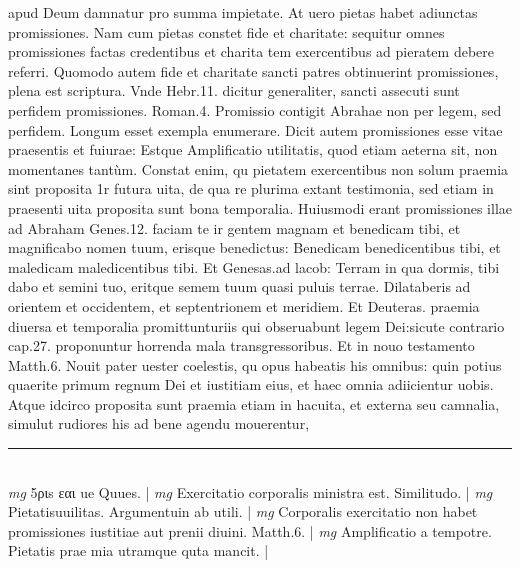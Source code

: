 \documentclass{article}
\begin{document}
\begin{pages}
apud Deum damnatur pro summa impietate. At uero pietas habet adiunctas promissiones. Nam cum pietas constet fide et charitate: sequitur omnes promissiones factas credentibus et charita tem exercentibus ad pieratem debere referri. Quomodo autem fide et charitate sancti patres obtinuerint promissiones, plena est scriptura. Vnde Hebr.11. dicitur generaliter, sancti assecuti sunt perfidem promissiones. Roman.4. Promissio contigit Abrahae non per legem, sed perfidem. Longum esset exempla enumerare. Dicit autem promissiones esse vitae praesentis et fuiurae: Estque Amplificatio utilitatis, quod etiam aeterna sit, non momentanes tantùm. Constat enim, qu pietatem exercentibus non solum praemia sint proposita 1r futura uita, de qua re plurima extant testimonia, sed etiam in praesenti uita proposita sunt bona temporalia. Huiusmodi erant promissiones illae ad Abraham Genes.12. faciam te ir gentem magnam et benedicam tibi, et magnificabo nomen tuum, erisque benedictus: Benedicam benedicentibus tibi, et maledicam maledicentibus tibi. Et Genesas.ad lacob: Terram in qua dormis, tibi dabo et semini tuo, eritque semem tuum quasi puluis terrae. Dilataberis ad orientem et occidentem, et septentrionem et meridiem. Et Deuteras. praemia diuersa et temporalia promittunturiis qui obseruabunt legem Dei:sicute contrario cap.27. proponuntur horrenda mala transgressoribus. Et in nouo testamento Matth.6. Nouit pater uester coelestis, qu opus habeatis his omnibus: quin potius quaerite primum regnum Dei et iustitiam eius, et haec omnia adiicientur uobis. Atque idcirco proposita sunt praemia etiam in hacuita, et externa seu camnalia, simulut rudiores his ad bene agendu mouerentur,  \pend
\vspace{0.5cm}\noindent
\vspace{0.2cm}\rule{1cm}{0.2pt}\\ 
\hspace{0.2cm}\textit{mg}
\footnotesize 5ριs εαι ue Quues. 
\normalsize| 
\hspace{0.2cm}\textit{mg}
\footnotesize Exercitatio corporalis ministra est. Similitudo. 
\normalsize| 
\hspace{0.2cm}\textit{mg}
\footnotesize Pietatisuuilitas. Argumentuin ab utili. 
\normalsize| 
\hspace{0.2cm}\textit{mg}
\footnotesize Corporalis exercitatio non habet promissiones iustitiae aut prenii diuini. Matth.6. 
\normalsize| 
\hspace{0.2cm}\textit{mg}
\footnotesize Amplificatio a tempotre. Pietatis prae mia utramque  quta mancit. 
\normalsize| 

\end{pages}
\end{document}
